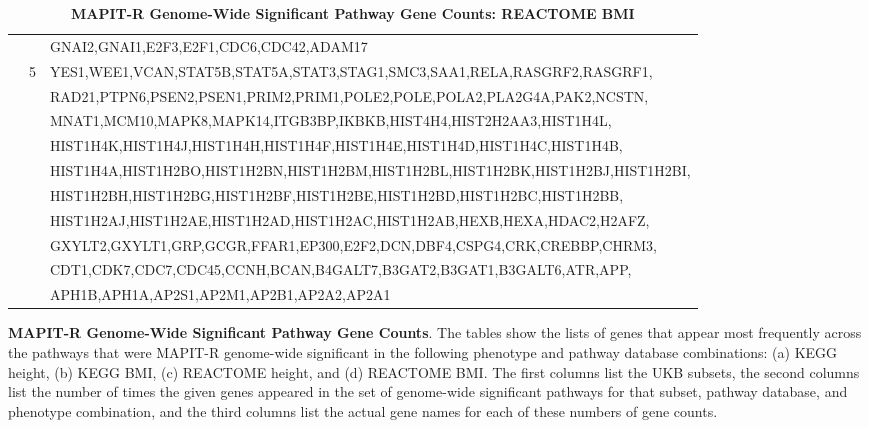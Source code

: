 \documentclass[12pt, a4paper]{article}
\begin{document}
\begin{landscape}
\begin{table}[ht]
\begin{tabular}{ccl}
    & & GNAI2,GNAI1,E2F3,E2F1,CDC6,CDC42,ADAM17 \\  
    & 5 & YES1,WEE1,VCAN,STAT5B,STAT5A,STAT3,STAG1,SMC3,SAA1,RELA,RASGRF2,RASGRF1, \\
    & & RAD21,PTPN6,PSEN2,PSEN1,PRIM2,PRIM1,POLE2,POLE,POLA2,PLA2G4A,PAK2,NCSTN, \\
    & & MNAT1,MCM10,MAPK8,MAPK14,ITGB3BP,IKBKB,HIST4H4,HIST2H2AA3,HIST1H4L, \\
    & & HIST1H4K,HIST1H4J,HIST1H4H,HIST1H4F,HIST1H4E,HIST1H4D,HIST1H4C,HIST1H4B, \\
    & & HIST1H4A,HIST1H2BO,HIST1H2BN,HIST1H2BM,HIST1H2BL,HIST1H2BK,HIST1H2BJ,HIST1H2BI, \\
    & & HIST1H2BH,HIST1H2BG,HIST1H2BF,HIST1H2BE,HIST1H2BD,HIST1H2BC,HIST1H2BB, \\
    & & HIST1H2AJ,HIST1H2AE,HIST1H2AD,HIST1H2AC,HIST1H2AB,HEXB,HEXA,HDAC2,H2AFZ, \\
    & & GXYLT2,GXYLT1,GRP,GCGR,FFAR1,EP300,E2F2,DCN,DBF4,CSPG4,CRK,CREBBP,CHRM3, \\
    & & CDT1,CDK7,CDC7,CDC45,CCNH,BCAN,B4GALT7,B3GAT2,B3GAT1,B3GALT6,ATR,APP, \\ 
    & & APH1B,APH1A,AP2S1,AP2M1,AP2B1,AP2A2,AP2A1 \\
   \hline
\end{tabular}
\caption[TBD]{\textbf{MAPIT-R Genome-Wide Significant Pathway Gene Counts: REACTOME BMI}}
\label{InterPath-Supp-Tables-AllPops-TopGeneCounts-REACTOME-BMI-a}
\end{table}
\clearpage
\addtocounter{table}{-1}
\addtocounter{CharNumber2}{1}
\end{landscape}
\renewcommand{\thetable}{\arabic{table}}
\setlength{\footskip}{1cm}

\begin{table} [t!]
  \caption{\textbf{MAPIT-R Genome-Wide Significant Pathway Gene Counts}. The tables show the lists of genes that appear most frequently across the pathways that were MAPIT-R genome-wide significant in the following phenotype and pathway database combinations: (a) KEGG height, (b) KEGG BMI, (c) REACTOME height, and (d) REACTOME BMI. The first columns list the UKB subsets, the second columns list the number of times the given genes appeared in the set of genome-wide significant pathways for that subset, pathway database, and phenotype combination, and the third columns list the actual gene names for each of these numbers of gene counts.}
\label{InterPath-Supp-Tables-AllPops-TopGeneCounts-Caption}
\end{table}
\clearpage
\end{document}
